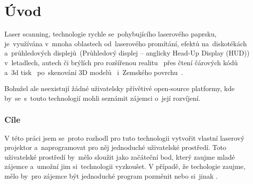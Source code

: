 \chapter*{Úvod}


Laser scanning, technologie rychle se~pohybujícího laserového paprsku, je~využívána v~mnoha oblastech od~laserového promítání, efektů na~diskotékách a~průhledových displejů~(Průhledový displej -- anglicky Head-Up Display (HUD)) v~letadlech, autech či brýlích pro rozšířenou realitu~\cite{laser-huds} přes čtení čárových kódů~\cite{history-of-barcode-scanning} a~3d tisk~\cite{Photo-curing-3D-printing} po~skenování 3D modelů~\cite{3d-model-scan} i~Zemského povrchu~\cite{heightmaps}.

Bohužel ale neexistují žádné uživatelsky přívětivé open-source platformy, kde by~se~s~touto technologií mohli seznámit zájemci o~její rozvíjení.

\subsection*{Cíle}
V této práci jsem se~proto rozhodl pro tuto technologii vytvořit vlastní laserový projektor a~naprogramovat pro něj jednoduché uživatelské prostředí.
Toto uživatelské prostředí by~mělo sloužit jako začáteční bod, který zaujme mladé zájemce a~umožní jim si~technologii vyzkoušet.
V případě, že techologie zaujme, mělo by~pro zájemce být jednoduché program pozměnit nebo si~jinak .
